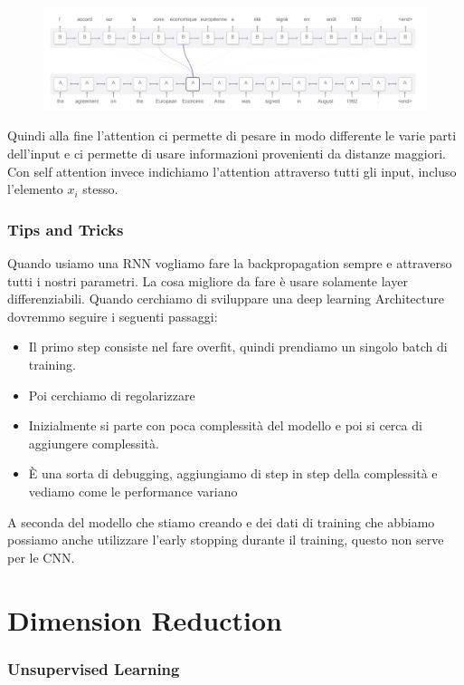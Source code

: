 \documentclass[14pt]{extreport}
\begin{document}
\begin{figure}[H]
	\centering
	\includegraphics[width=0.7\linewidth]{431.jpeg}
\end{figure}

Quindi alla fine l'attention ci permette di pesare in modo differente le varie parti dell'input e ci permette di usare informazioni provenienti da
distanze maggiori. Con self attention invece indichiamo l'attention attraverso tutti gli input, incluso l'elemento $x_i$ stesso.

\subsection{Tips and Tricks}

Quando usiamo una RNN vogliamo fare la backpropagation sempre e attraverso tutti i nostri parametri. La cosa migliore da fare è usare solamente layer
differenziabili. Quando cerchiamo di sviluppare una deep learning Architecture dovremmo seguire i seguenti passaggi:
\begin{itemize}
	\item Il primo step consiste nel fare overfit, quindi prendiamo un singolo batch di training.
	\item Poi cerchiamo di regolarizzare
	\item Inizialmente si parte con poca complessità del modello e poi si cerca di aggiungere complessità.
	\item È una sorta di debugging, aggiungiamo di step in step della complessità e vediamo come le performance variano

\end{itemize}

A seconda del modello che stiamo creando e dei dati di training che abbiamo possiamo anche utilizzare l'early stopping durante il training, questo non
serve per le CNN.


\chapter{Dimension Reduction}

\subsection{Unsupervised Learning}
\end{document}
